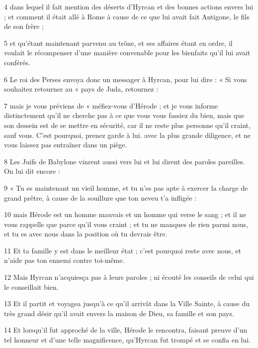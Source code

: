 \par 4 dans lequel il fait mention des déserts d'Hyrcan et des bonnes actions envers lui ; et comment il était allé à Rome à cause de ce que lui avait fait Antigone, le fils de son frère ;

\par 5 et qu'étant maintenant parvenu au trône, et ses affaires étant en ordre, il voulait le récompenser d'une manière convenable pour les bienfaits qu'il lui avait conférés.

\par 6 Le roi des Perses envoya donc un messager à Hyrcan, pour lui dire : « Si vous souhaitez retourner au « pays de Juda, retournez :

\par 7 mais je vous préviens de « méfiez-vous d'Hérode ; et je vous informe distinctement qu'il ne cherche pas à ce que vous vous fassiez du bien, mais que son dessein est de se mettre en sécurité, car il ne reste plus personne qu'il craint, sauf vous. C'est pourquoi, prenez garde à lui. avec la plus grande diligence, et ne vous laissez pas entraîner dans un piège.

\par 8 Les Juifs de Babylone vinrent aussi vers lui et lui dirent des paroles pareilles. On lui dit encore :

\par 9 « Tu es maintenant un vieil homme, et tu n'es pas apte à exercer la charge de grand prêtre, à cause de la souillure que ton neveu t'a infligée :

\par 10 mais Hérode est un homme mauvais et un homme qui verse le sang ; et il ne vous rappelle que parce qu'il vous craint ; et tu ne manques de rien parmi nous, et tu es avec nous dans la position où tu devrais être.

\par 11 Et ta famille y est dans le meilleur état ; c'est pourquoi reste avec nous, et n'aide pas ton ennemi contre toi-même.

\par 12 Mais Hyrcan n'acquiesça pas à leurs paroles ; ni écouté les conseils de celui qui le conseillait bien.

\par 13 Et il partit et voyagea jusqu'à ce qu'il arrivât dans la Ville Sainte, à cause du très grand désir qu'il avait envers la maison de Dieu, sa famille et son pays.

\par 14 Et lorsqu'il fut approché de la ville, Hérode le rencontra, faisant preuve d'un tel honneur et d'une telle magnificence, qu'Hyrcan fut trompé et se confia en lui.


